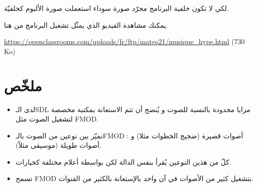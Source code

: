 لكي لا تكون خلفية البرنامج مجرّد صورة سوداء استعملت صورة الألبوم كخلفيّة.

يمكنك مشاهدة الفيديو الذي يمثّل تشغيل البرنامج من هنا.

\textenglish{\url{https://openclassrooms.com/uploads/fr/ftp/mateo21/musique_hype.html} (730 Ko)}

\section*{ملخّص}

\begin{itemize}
	\item لدى الـ\textenglish{SDL}
	مزايا محدودة بالنسبة للصوت و يُنصح أن تتم الاستعانة بمكتبة مخصصة لتشغيل الصوت مثل
	\textenglish{FMOD}.
	\item نميّز بين نوعين من الصوت بالـ\textenglish{FMOD} :
	أصوات قصيرة (ضجيج الخطوات مثلا) و أصوات طويلة (موسيقى مثلاً).
	\item كلّ من هذين النوعين يُقرأ بنفس الدالة لكن بواسطة أعلام مختلفة كخيارات.
	\item تسمح
	\textenglish{FMOD}
	بتشغيل كثير من الأصوات في آن واحد بالإستعانة بالكثير من القنوات.
\end{itemize}
